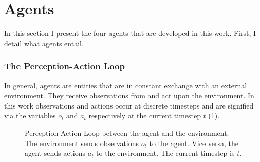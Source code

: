 \section{Agents}
\label{sec:2}

In this section I present the four agents that are developed in this work. First, I detail what agents entail.

\subsubsection{The Perception-Action Loop}

In general, agents are entities that are in constant exchange with an external environment. They receive observations from and act upon the environment. In this work observations and actions occur at discrete timesteps and are signified via the variables \(o_t\) and \(a_t\) respectively at the current timestep \(t\) (\cref{fig:23}).
\begin{figure}[htbp]
    \centering
    \caption{Perception-Action Loop between the agent and the environment. The environment sends observations \(o_t\) to the agent. Vice versa, the agent sends actions \(a_t\) to the environment. The current timestep is \(t\).}
    \label{fig:23}
\end{figure}
